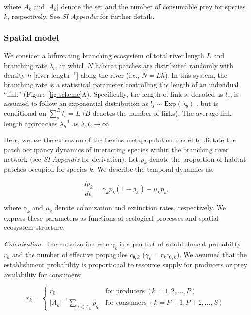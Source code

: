 \documentclass[11pt, class=article, crop=false]{standalone}
\begin{document}
where $A_{k}$ and $|A_{k}|$ denote the set and the number of consumable prey for species $k$, respectively.
See \textit{SI Appendix} for further details.

\subsubsection{Spatial model}

We consider a bifurcating branching ecosystem of total river length $L$ and branching rate $\lambda_b$, in which $N$ habitat patches are distributed randomly with density $h$ [river length$^{-1}$] along the river (i.e., $N = Lh$).
In this system, the branching rate is a statistical parameter controlling the length of an individual ``link'' (Figure \ref{fig:scheme}A).
Specifically, the length of link $s$, denoted as $l_s$, is assumed to follow an exponential distribution as $l_s \sim \mbox{Exp}(\lambda_b)$ \citep{peckham_reformulation_1999, terui_metapopulation_2018, terui_emergent_2021}, but is conditional on $\sum_s^B l_s = L$ ($B$ denotes the number of links).
The average link length approaches $\lambda_b^{-1}$ as $\lambda_b L \rightarrow \infty$.

Here, we use the extension of the Levins metapopulation model to dictate the patch occupancy dynamics of interacting species within the branching river network \citep{calcagno_constraints_2011, takimoto_effects_2012, guo_towards_2023} (see \textit{SI Appendix} for derivation).
Let $p_k$ denote the proportion of habitat patches occupied for species $k$.
We describe the temporal dynamics as:

\begin{equation}
    \frac{dp_k}{dt} = \gamma_{k} p_k (1 - p_k) - \mu_k p_k,
\end{equation}

where $\gamma_k$ and $\mu_k$ denote colonization and extinction rates, respectively.
We express these parameters as functions of ecological processes and spatial ecosystem structure.

\textit{Colonization}. The colonization rate $\gamma_k$ is a product of establishment probability $r_k$ and the number of effective propagules $c_{0,k}$ ($\gamma_k = r_k c_{0,k}$).
We assumed that the establishment probability is proportional to resource supply for producers or prey availability for consumers:

\begin{equation}
    r_{k} = 
    \begin{cases}
        r_0 & ~\text{for producers}~ (k=1, 2, \ldots, P)\\
        |A_{k}|^{-1} \sum_{q~\in A_{k}} p_{q} & ~\text{for consumers}~ (k=P+1, P+2, \ldots, S)
    \end{cases}
\end{equation}
\end{document}
